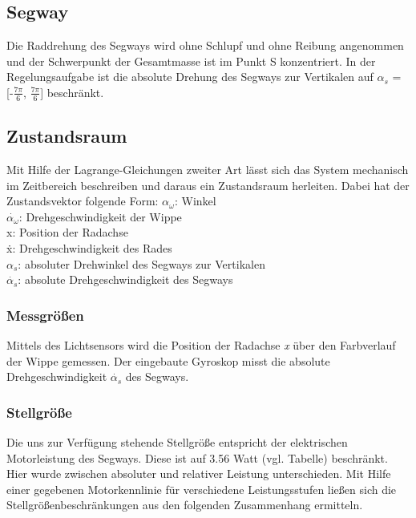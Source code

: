 \documentclass[pdf]{ifacconf}
\begin{document}
	\subsection{Segway}
	Die Raddrehung des Segways wird ohne Schlupf und ohne Reibung angenommen und der 		Schwerpunkt der Gesamtmasse ist im Punkt S konzentriert. 
	In der Regelungsaufgabe ist die absolute Drehung des Segways zur Vertikalen auf 		$\alpha^{}_{s}$ = [-$\frac{7\pi}{6}$, $\frac{7\pi}{6}$] beschränkt. %

	\subsection{Zustandsraum}
	Mit Hilfe der Lagrange-Gleichungen zweiter Art lässt sich das System mechanisch 		im Zeitbereich beschreiben und daraus ein Zustandsraum herleiten.
	Dabei hat der Zustandsvektor folgende Form:
	$\alpha^{}_{\omega}$: Winkel\\
	$\dot{\alpha^{}_{\omega}}$: Drehgeschwindigkeit der Wippe\\
	x:  Position der Radachse\\
	\.{x}:  Drehgeschwindigkeit des Rades\\
	$\alpha^{}_{s}$: absoluter Drehwinkel des Segways zur Vertikalen\\
	$\dot{\alpha^{}_{s}}$: absolute Drehgeschwindigkeit des Segways\\
	
		\subsubsection{Messgrößen}
		Mittels des Lichtsensors wird die Position der Radachse \textit{x} über den 		Farbverlauf der Wippe gemessen. Der eingebaute Gyroskop misst die absolute Drehgeschwindigkeit $\dot{\alpha^{}_{s}}$ des Segways.
		
		\subsubsection{Stellgröße}
		Die uns zur Verfügung stehende Stellgröße entspricht der elektrischen Motorleistung des Segways. Diese ist auf 3.56 Watt (vgl. Tabelle) beschränkt.
		Hier wurde zwischen absoluter und relativer Leistung unterschieden. Mit Hilfe einer gegebenen Motorkennlinie für verschiedene Leistungsstufen ließen sich die Stellgrößenbeschränkungen aus den folgenden Zusammenhang ermitteln.
\end{document}

